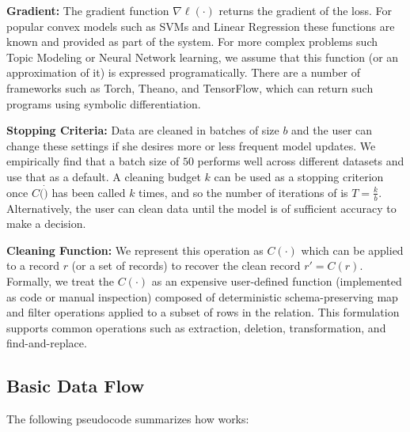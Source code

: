 \vspace{0.25em}

\noindent\textbf{Gradient:} The gradient function $\nabla\ell(\cdot)$ returns the gradient of the loss. 
For popular convex models such as SVMs and Linear Regression these functions are known and provided as part of the system. 
For more complex problems such Topic Modeling or Neural Network learning, we assume that this function (or an approximation of it) is expressed programatically. There are a number of frameworks such as Torch, Theano, and TensorFlow, which can return such programs using symbolic differentiation. 

\vspace{0.25em}

\noindent\textbf{Stopping Criteria: } Data are cleaned in batches of size $b$ and the user can change these settings if she desires more or less frequent model updates.
We empirically find that a batch size of $50$ performs well across different datasets and use that as a default.
A cleaning budget $k$ can be used as a stopping criterion once $C(\dot)$ has been called $k$ times, and so the number of iterations of \sys is $T = \frac{k}{b}$.
Alternatively, the user can clean data until the model is of sufficient accuracy to make a decision.

\vspace{0.25em}

\noindent\textbf{Cleaning Function: } We represent this operation as $C(\cdot)$ which can be applied to a record $r$ (or a set of records) to recover the clean record $r' = C(r)$.
Formally, we treat the $C(\cdot)$ as an expensive user-defined function (implemented as code or  manual inspection) composed of deterministic schema-preserving \textsf{map} and \textsf{filter} operations applied to a subset of rows in the relation. 
This formulation supports common operations such as extraction, deletion, transformation, and find-and-replace.

\subsection{Basic Data Flow} \label{df}
The following pseudocode summarizes how \sys works:

